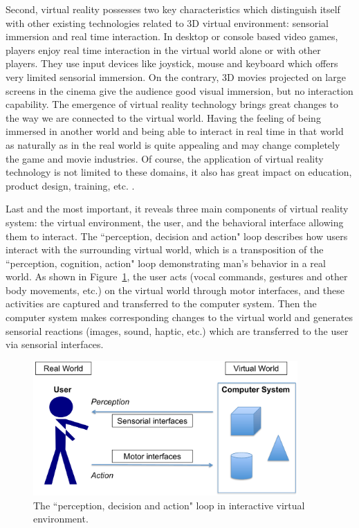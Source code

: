 Second, virtual reality possesses two key characteristics which distinguish itself with other existing technologies related to 3D virtual environment: sensorial immersion and real time interaction. In desktop or console based video games, players enjoy real time interaction in the virtual world alone or with other players. They use input devices like joystick, mouse and keyboard which offers very limited sensorial immersion. On the contrary, 3D movies projected on large screens in the cinema give the audience good visual immersion, but no interaction capability. The emergence of virtual reality technology brings great changes to the way we are connected to the virtual world. Having the feeling of being immersed in another world and being able to interact in real time in that world as naturally as in the real world is quite appealing and may change completely the game and movie industries. Of course, the application of virtual reality technology is not limited to these domains, it also has great impact on education, product design, training, etc. \citep{Hale2014Handbook}.

Last and the most important, it reveals three main components of virtual reality system: the virtual environment, the user, and the behavioral interface allowing them to interact. The ``perception, decision and action" loop \citep{Fuchs2011Book} describes how users interact with the surrounding virtual world, which is a transposition of the ``perception, cognition, action" loop demonstrating man's behavior in a real world. As shown in Figure~\ref{fig:1_loop}, the user acts (vocal commands, gestures and other body movements, etc.) on the virtual world through motor interfaces, and these activities are captured and transferred to the computer system. Then the computer system makes corresponding changes to the virtual world and generates sensorial reactions (images, sound, haptic, etc.) which are transferred to the user via sensorial interfaces.

\begin{figure}[htb]
  \centering
  \includegraphics[width=0.9\textwidth]{figures/ch1/loop}
  \caption{\label{fig:1_loop}The ``perception, decision and action" loop in interactive virtual environment.}
\end{figure}

